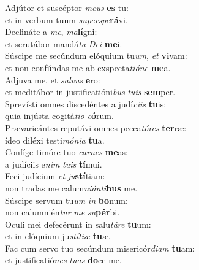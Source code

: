 \evenverse Adjútor et suscéptor \textit{me}\textit{us} \textbf{es} tu:~\*\\
\evenverse et in verbum tuum \textit{su}\textit{per}\textit{spe}\textbf{rá}vi.\\
\oddverse Declináte a \textit{me}, \textit{ma}\textbf{lí}gni:~\*\\
\oddverse et scrutábor mandá\textit{ta} \textit{De}\textit{i} \textbf{me}i.\\
\evenverse Súscipe me secúndum elóquium tu\textit{um}, \textit{et} \textbf{vi}vam:~\*\\
\evenverse et non confúndas me ab exspecta\textit{ti}\textit{ó}\textit{ne} \textbf{me}a.\\
\oddverse Adjuva me, et \textit{sal}\textit{vus} \textbf{e}ro:~\*\\
\oddverse et meditábor in justificatióni\textit{bus} \textit{tu}\textit{is} \textbf{sem}per.\\
\evenverse Sprevísti omnes discedéntes a judí\textit{ci}\textit{is} \textbf{tu}is:~\*\\
\evenverse quia injústa cogitá\textit{ti}\textit{o} \textit{e}\textbf{ó}rum.\\
\oddverse Prævaricántes reputávi omnes pecca\textit{tó}\textit{res} \textbf{ter}ræ:~\*\\
\oddverse ídeo diléxi testi\textit{mó}\textit{ni}\textit{a} \textbf{tu}a.\\
\evenverse Confíge timóre tuo \textit{car}\textit{nes} \textbf{me}as:~\*\\
\evenverse a judíciis e\textit{nim} \textit{tu}\textit{is} \textbf{tí}mui.\\
\oddverse Feci judícium \textit{et} \textit{ju}\textbf{stí}tiam:~\*\\
\oddverse non tradas me calum\textit{ni}\textit{án}\textit{ti}\textbf{bus} me.\\
\evenverse Súscipe servum tu\textit{um} \textit{in} \textbf{bo}num:~\*\\
\evenverse non calumnién\textit{tur} \textit{me} \textit{su}\textbf{pér}bi.\\
\oddverse Oculi mei defecérunt in salu\textit{tá}\textit{re} \textbf{tu}um:~\*\\
\oddverse et in elóquium ju\textit{stí}\textit{ti}\textit{æ} \textbf{tu}æ.\\
\evenverse Fac cum servo tuo secúndum misericór\textit{di}\textit{am} \textbf{tu}am:~\*\\
\evenverse et justificatió\textit{nes} \textit{tu}\textit{as} \textbf{do}ce me.\\
